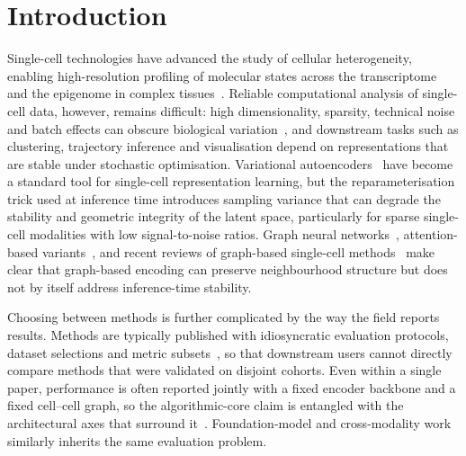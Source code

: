 \documentclass[referee, pdflatex, sn-vancouver-num]{sn-jnl}
\begin{document}
\section{Introduction}

Single-cell technologies have advanced the study of cellular heterogeneity, enabling high-resolution profiling of molecular states across the transcriptome and the epigenome in complex tissues~\cite{ma2020single}. Reliable computational analysis of single-cell data, however, remains difficult: high dimensionality, sparsity, technical noise and batch effects can obscure biological variation~\cite{luecken2022benchmarking,stuart2019integrative}, and downstream tasks such as clustering, trajectory inference and visualisation depend on representations that are stable under stochastic optimisation. Variational autoencoders~\cite{lopez2018deep,gayoso2021joint,xu2021deep} have become a standard tool for single-cell representation learning, but the reparameterisation trick used at inference time introduces sampling variance that can degrade the stability and geometric integrity of the latent space, particularly for sparse single-cell modalities with low signal-to-noise ratios. Graph neural networks~\cite{wang2021scgnn,liao2023deep}, attention-based variants~\cite{laghaee2024scvag,lv2024ssgate}, and recent reviews of graph-based single-cell methods~\cite{li2025gnnreview,ge2025dlreview} make clear that graph-based encoding can preserve neighbourhood structure but does not by itself address inference-time stability.

Choosing between methods is further complicated by the way the field reports results. Methods are typically published with idiosyncratic evaluation protocols, dataset selections and metric subsets~\cite{tran2020benchmark}, so that downstream users cannot directly compare methods that were validated on disjoint cohorts. Even within a single paper, performance is often reported jointly with a fixed encoder backbone and a fixed cell--cell graph, so the algorithmic-core claim is entangled with the architectural axes that surround it~\cite{duo2018comparison,saelens2019comparison}. Foundation-model and cross-modality work~\cite{cui2024scgpt,theodoris2023geneformer,lin2022scjoint,li2024moh,cao2022glue} similarly inherits the same evaluation problem.
\end{document}
